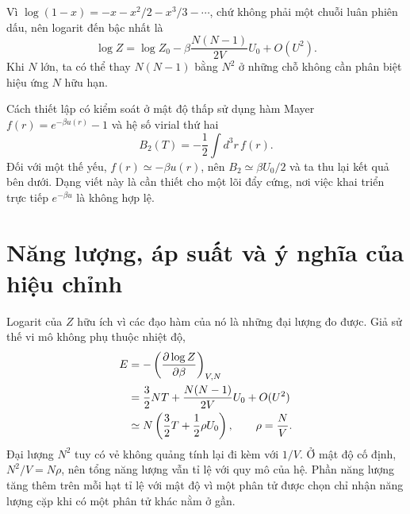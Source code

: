 \begin{classroomqa}
\end{classroomqa}

Vì \(\log(1-x)=-x-x^2/2-x^3/3-\cdots\), chứ không phải một chuỗi luân phiên dấu, nên logarit đến bậc nhất là
\begin{equation}
 \log Z
 =
 \log Z_0
 -\beta\frac{N(N-1)}{2V}U_0
 +O(U^2).
 \label{eq:sm6-logz-correction}
\end{equation}
Khi \(N\) lớn, ta có thể thay \(N(N-1)\) bằng \(N^2\) ở những chỗ không cần phân biệt hiệu ứng \(N\) hữu hạn.

\begin{remark}
Cách thiết lập có kiểm soát ở mật độ thấp sử dụng hàm Mayer
\(f(r)=e^{-\beta u(r)}-1\) và hệ số virial thứ hai
\begin{equation}
 B_2(T)=-\frac{1}{2}\int d^3r\,f(r).
 \label{eq:sm6-second-virial}
\end{equation}
Đối với một thế yếu, \(f(r)\simeq-\beta u(r)\), nên
\(B_2\simeq\beta U_0/2\) và ta thu lại kết quả bên dưới. Dạng viết này là cần thiết cho một lõi đẩy cứng, nơi việc khai triển trực tiếp \(e^{-\beta u}\) là không hợp lệ.
\end{remark}

\section{Năng lượng, áp suất và ý nghĩa của hiệu chỉnh}

Logarit của \(Z\) hữu ích vì các đạo hàm của nó là những đại lượng đo được. Giả sử thế vi mô không phụ thuộc nhiệt độ,
\begin{align}
 E
 &=-\left(\frac{\partial\log Z}{\partial\beta}\right)_{V,N} \notag\\
 &=
 \frac{3}{2}NT
 +\frac{N(N-1)}{2V}U_0+O(U^2) \notag\\
 &\simeq
 N\left(\frac{3}{2}T+\frac{1}{2}\rho U_0\right),
 \qquad
 \rho=\frac{N}{V}.
 \label{eq:sm6-energy-correction}
\end{align}
Đại lượng \(N^2\) tuy có vẻ không quảng tính lại đi kèm với \(1/V\). Ở mật độ cố định, \(N^2/V=N\rho\), nên tổng năng lượng vẫn tỉ lệ với quy mô của hệ. Phần năng lượng tăng thêm trên mỗi hạt tỉ lệ với mật độ vì một phân tử được chọn chỉ nhận năng lượng cặp khi có một phân tử khác nằm ở gần.


